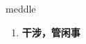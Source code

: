 
\begin{frame}
{\huge meddle}
\begin{center}
\begin{enumerate}\Large
  \item \textbf{干涉，管闲事}
\end{enumerate}
\end{center}
\end{frame}
